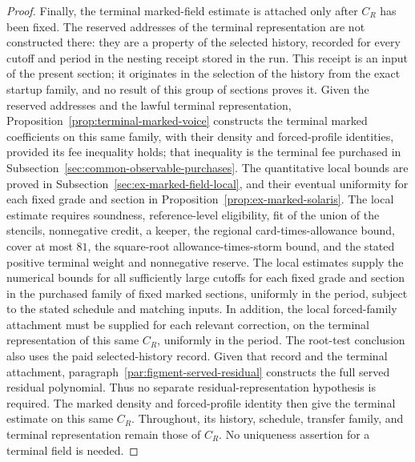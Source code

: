 \begin{proof}
Finally, the terminal marked-field estimate is attached only after $C_R$
has been fixed. The reserved addresses of the terminal representation
are not constructed there: they are a property of the selected history,
recorded for every cutoff and period in the nesting receipt stored in the
run. This receipt is an input of the present section; it originates in the
selection of the history from the exact startup family, and no result of
this group of sections proves it. Given the reserved addresses and the
lawful terminal representation,
Proposition~\ref{prop:terminal-marked-voice} constructs the terminal
marked coefficients on this same family, with their density and
forced-profile identities, provided its fee inequality holds; that
inequality is the terminal fee purchased in
Subsection~\ref{sec:common-observable-purchases}. The quantitative local
bounds are proved in Subsection~\ref{sec:ex-marked-field-local}, and their
eventual uniformity for each fixed grade and section in
Proposition~\ref{prop:ex-marked-solaris}. The local estimate requires soundness,
reference-level eligibility, fit of the union of the stencils, nonnegative
credit, a keeper, the regional card-times-allowance bound, cover at most
$81$, the square-root allowance-times-storm bound, and the stated positive
terminal weight and nonnegative reserve. The local estimates supply the
numerical bounds for all sufficiently large cutoffs for each fixed grade
and section in the purchased family of fixed marked sections, uniformly in the period, subject to
the stated schedule and matching inputs. In addition, the local
forced-family attachment must be supplied for each relevant correction,
on the terminal representation of this same $C_R$, uniformly in the
period. The root-test conclusion also uses the paid selected-history
record. Given that record and the terminal attachment,
paragraph~\ref{par:figment-served-residual} constructs the full served
residual polynomial. Thus no separate residual-representation hypothesis
is required. The marked density and forced-profile identity then give
the terminal estimate on this same $C_R$.
Throughout, its history, schedule, transfer family, and terminal
representation remain those of $C_R$. No uniqueness assertion for a
terminal field is needed.
\end{proof}

